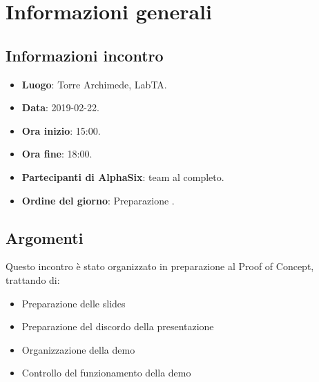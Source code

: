 \newcommand{\documento}{\VI}
\newcommand{\nomedocumentofisico}{VI\_2019-02-22.pdf}
\newcommand{\redazione}{\MM}
\newcommand{\verifica}{\CV}
\newcommand{\approvazione}{\SG}
\newcommand{\versione}{1.0.0}
\newcommand{\uso}{Interno}
\newcommand{\destinateTo}{\gruppo}
\newcommand{\datacreazione}{23 febbraio 2019}
\newcommand{\datamodifica}{25 febbraio 2019}
\newcommand{\stato}{Approvato}

\def\TABELLE{false}	%
\def\FIGURE{false} 	%






    

    	
    
    \section{Informazioni generali}
		\subsection{Informazioni incontro}
			\begin{itemize}
				\item \textbf{Luogo}: Torre Archimede, LabTA.
				\item \textbf{Data}: 2019-02-22.
				\item \textbf{Ora inizio}: 15:00.
				\item \textbf{Ora fine}: 18:00.
				\item \textbf{Partecipanti di AlphaSix}: team al completo.
				\item \textbf{Ordine del giorno}: Preparazione .
			\end{itemize}

        \subsection{Argomenti}
            Questo incontro è stato organizzato in preparazione al Proof of Concept, trattando di:
            \begin{itemize}
                \item Preparazione delle slides
                \item Preparazione del discordo della presentazione
                \item Organizzazione della demo
                \item Controllo del funzionamento della demo
            \end{itemize}

